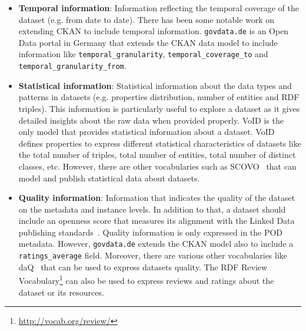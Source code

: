 \documentclass[runningheads,a4paper]{../../Tools/LaTEX/llncs}
\begin{document}
\begin{itemize}
 \item \textbf{Temporal information}: Information reflecting the temporal coverage of the dataset (e.g. from date to date). There has been some notable work on extending CKAN to include temporal information. \texttt{govdata.de} is an Open Data portal in Germany that extends the CKAN data model to include information like \texttt{temporal\_granularity}, \texttt{temporal\_coverage\_to} and \texttt{temporal\_granularity\_from}.
 \item \textbf{Statistical information}: Statistical information about the data types and patterns in datasets (e.g. properties distribution, number of entities and RDF triples). This information is particularly useful to explore a dataset as it gives detailed insights about the raw data when provided properly. VoID is the only model that provides statistical information about a dataset. VoID defines properties to express different statistical characteristics of datasets like the total number of triples, total number of entities, total number of distinct classes, etc. However, there are other vocabularies such as SCOVO~\cite{Hausenblas:ESWC:09} that can model and publish statistical data about datasets.
 \item \textbf{Quality information}: Information that indicates the quality of the dataset on the metadata and instance levels. In addition to that, a dataset should include an openness score that measures its alignment with the Linked Data publishing standards~\cite{Berners-Lee:W3C:06}. Quality information is only expressed in the POD metadata. However, \texttt{govdata.de} extends the CKAN model also to include a \texttt{ratings\_average} field. Moreover, there are various other vocabularies like daQ~\cite{Debattista:WWW:14} that can be used to express datasets quality. The RDF Review Vocabulary\footnote{\url{http://vocab.org/review/}} can also be used to express reviews and ratings about the dataset or its resources.
\end{itemize}

\end{document}
